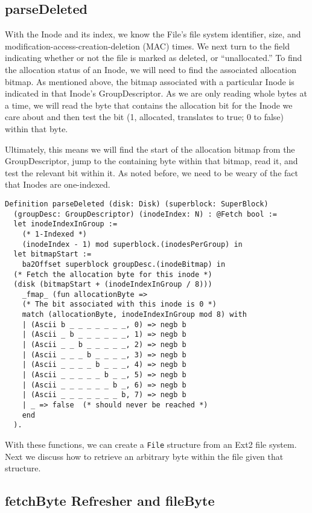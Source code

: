 \documentclass[nocopyrightspace]{sigplanconf}
\begin{document}
\subsection{parseDeleted}
With the Inode and its index, we know the File's file system identifier, size,
and modification-access-creation-deletion (MAC) times.  We next turn to the
field indicating whether or not the file is marked as deleted, or
``unallocated.'' To find the allocation status of an Inode, we will need to
find the associated allocation bitmap. As mentioned above, the bitmap
associated with a particular Inode is indicated in that Inode's
GroupDescriptor. As we are only reading whole bytes at a time, we will read
the byte that contains the allocation bit for the Inode we care about and then
test the bit (1, allocated, translates to true; 0 to false) within that byte.

Ultimately, this means we will find the start of the allocation bitmap from
the GroupDescriptor, jump to the containing byte within that bitmap, read it,
and test the relevant bit within it. As noted before, we need to be weary of
the fact that Inodes are one-indexed.

\begin{lstlisting}
Definition parseDeleted (disk: Disk) (superblock: SuperBlock)
  (groupDesc: GroupDescriptor) (inodeIndex: N) : @Fetch bool :=
  let inodeIndexInGroup := 
    (* 1-Indexed *)
    (inodeIndex - 1) mod superblock.(inodesPerGroup) in
  let bitmapStart := 
    ba2Offset superblock groupDesc.(inodeBitmap) in
  (* Fetch the allocation byte for this inode *)
  (disk (bitmapStart + (inodeIndexInGroup / 8))) 
    _fmap_ (fun allocationByte =>
    (* The bit associated with this inode is 0 *)
    match (allocationByte, inodeIndexInGroup mod 8) with
    | (Ascii b _ _ _ _ _ _ _, 0) => negb b
    | (Ascii _ b _ _ _ _ _ _, 1) => negb b
    | (Ascii _ _ b _ _ _ _ _, 2) => negb b
    | (Ascii _ _ _ b _ _ _ _, 3) => negb b
    | (Ascii _ _ _ _ b _ _ _, 4) => negb b
    | (Ascii _ _ _ _ _ b _ _, 5) => negb b
    | (Ascii _ _ _ _ _ _ b _, 6) => negb b
    | (Ascii _ _ _ _ _ _ _ b, 7) => negb b
    | _ => false  (* should never be reached *)
    end
  ).
\end{lstlisting}

With these functions, we can create a {\tt File} structure from an Ext2 file
system. Next we discuss how to retrieve an arbitrary byte within the file
given that structure.

\subsection{fetchByte Refresher and fileByte}
\end{document}
